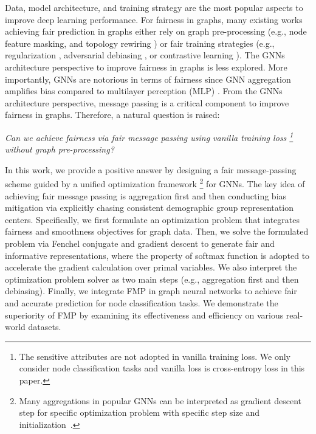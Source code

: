 \documentclass[letterpaper]{article} %
\theoremstyle{plain}
\theoremstyle{definition}
\theoremstyle{remark}
\begin{document}
Data, model architecture, and training strategy are the most popular aspects to improve deep learning performance. For fairness in graphs,
many existing works achieving fair prediction in graphs either rely on graph pre-processing (e.g., node feature masking\citep{kose2021fairness}, and topology rewiring \citep{dong2022edits}) or fair training strategies (e.g., regularization \citep{jiang2022generalized}, adversarial debiasing \citep{dai2021say}, or contrastive learning \citep{Zhu:2020vf,zhu2021graph,agarwal2021towards,ling2023learning}). The GNNs architecture perspective to improve fairness in graphs is less explored. More importantly, GNNs are notorious in terms of fairness since GNN aggregation amplifies bias compared to multilayer perception (MLP) \citep{dai2021say}. From the GNNs architecture perspective, message passing is a critical component to improve fairness in graphs.
Therefore, a natural question is raised:
\begin{center}
    \textit{Can we achieve fairness via fair message passing using vanilla training loss \footnote{The sensitive attributes are not adopted in vanilla training loss. We only consider node classification tasks and vanilla loss is cross-entropy loss in this paper.} without graph pre-processing?}
\end{center}

In this work, we provide a positive answer by designing a fair message-passing scheme guided by a unified optimization framework \footnote{Many aggregations in popular GNNs can be interpreted as gradient descent step for specific optimization problem with specific step size and initialization~\citep{ma2021unified,zhu2021graph}.} for GNNs. The key idea of achieving fair message passing is aggregation first and then conducting bias mitigation via explicitly chasing consistent demographic group representation centers. Specifically,
we first formulate an optimization problem that integrates fairness and smoothness objectives for graph data. Then, we solve the formulated problem via Fenchel conjugate and gradient descent to generate fair and informative representations, where the property of softmax function is adopted to accelerate the gradient calculation over primal variables. We also interpret the optimization problem solver as two main steps (e.g., aggregation first and then debiasing). Finally, we integrate FMP in graph neural networks to achieve fair and accurate prediction for node classification tasks. We demonstrate the superiority of FMP by examining its effectiveness and efficiency on various real-world datasets.
\end{document}
